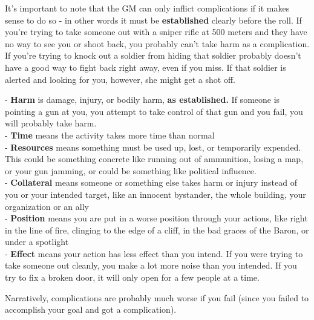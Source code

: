 It’s important to note that the GM can only inflict complications if it makes sense to do so - in other words it must be \textbf{established} clearly before the roll. If you’re trying to take someone out with a sniper rifle at 500 meters and they have no way to see you or shoot back, you probably can’t take harm as a complication. If you’re trying to knock out a soldier from hiding that soldier probably doesn’t have a good way to fight back right away, even if you miss. If that soldier is alerted and looking for you, however, she might get a shot off.

-    \textbf{Harm} is damage, injury, or bodily harm, \textbf{as established.} If someone is pointing a gun at you, you attempt to take control of that gun and you fail, you will probably take harm.\\
-   \textbf{Time} means the activity takes more time than normal\\
-   \textbf{Resources} means something must be used up, lost, or temporarily expended. This could be something concrete like running out of ammunition, losing a map, or your gun jamming, or could be something like political influence.\\
-   \textbf{Collateral} means someone or something else takes harm or injury instead of you or your intended target, like an innocent bystander, the whole building, your organization or an ally\\
-   \textbf{Position} means you are put in a worse position through your actions, like right in the line of fire, clinging to the edge of a cliff, in the bad graces of the Baron, or under a spotlight\\
-   \textbf{Effect} means your action has less effect than you intend. If you were trying to take someone out cleanly, you make a lot more noise than you intended. If you try to fix a broken door, it will only open for a few people at a time. 

Narratively, complications are probably much worse if you fail (since you failed to accomplish your goal and got a complication). 

